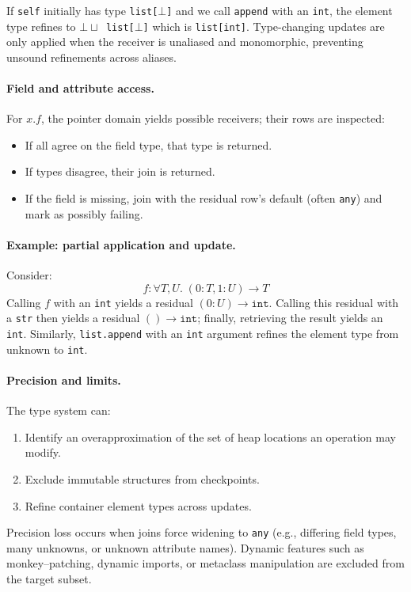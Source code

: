 If \texttt{self} initially has type \texttt{list[$\bot$]} and we call \texttt{append} with an \texttt{int}, the element type refines to \texttt{$\bot \sqcup$ list[$\bot$]} which is \texttt{list[int]}.  
Type-changing updates are only applied when the receiver is unaliased and monomorphic, preventing unsound refinements across aliases.

\paragraph{Field and attribute access.}
For $x.f$, the pointer domain yields possible receivers; their rows are inspected:
\begin{itemize}
  \item If all agree on the field type, that type is returned.
  \item If types disagree, their join is returned.
  \item If the field is missing, join with the residual row's default (often \texttt{any}) and mark as possibly failing.
\end{itemize}

\paragraph{Example: partial application and update.}
Consider:
\[
f : \forall T,U.\; (0:T, 1:U) \to T
\]
Calling $f$ with an \texttt{int} yields a residual $(0:U) \to \texttt{int}$.  
Calling this residual with a \texttt{str} then yields a residual  $() \to \texttt{int}$; finally, retrieving the result yields an \texttt{int}.  
Similarly, \texttt{list.append} with an \texttt{int} argument refines the element type from unknown to \texttt{int}.

\paragraph{Precision and limits.}
The type system can:
\begin{enumerate}
  \item Identify an overapproximation of the set of heap locations an operation may modify.
  \item Exclude immutable structures from checkpoints.
  \item Refine container element types across updates.
\end{enumerate}
Precision loss occurs when joins force widening to \texttt{any} (e.g., differing field types, many unknowns, or unknown attribute names).  
Dynamic features such as monkey--patching, dynamic imports, or metaclass manipulation are excluded from the target subset.

